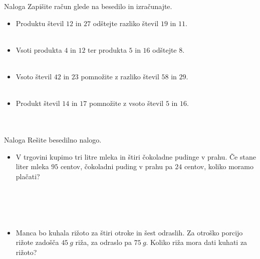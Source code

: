         \begin{frame}
            \begin{exampleblock}{Naloga}
                Zapišite račun glede na besedilo in izračunajte.
                \begin{itemize}
                    \item Produktu števil $12$ in $27$ odštejte razliko števil $19$ in $11$. \\ ~
                    \item Vsoti produkta $4$ in $12$ ter produkta $5$ in $16$ odštejte $8$. \\ ~
                    \item Vsoto števil $42$ in $23$ pomnožite z razliko števil $58$ in $29$. \\ ~
                    \item Produkt števil $14$ in $17$ pomnožite z vsoto števil $5$ in $16$. \\ ~ \\ ~
                \end{itemize}
            \end{exampleblock}
        \end{frame}

        \begin{frame}
            \begin{exampleblock}{Naloga}
                Rešite besedilno nalogo.
                \begin{itemize}
                    \item V trgovini kupimo tri litre mleka in štiri čokoladne pudinge v prahu. Če stane liter mleka $95$ centov,
                        čokoladni puding v prahu pa $24$ centov, koliko moramo plačati? \\ ~ \\ ~ \\ ~ \\ ~
                    \item Manca bo kuhala rižoto za štiri otroke in šest odraslih. Za otroško porcijo rižote zadošča $45~g$ riža,
                        za odraslo pa $75~g$. Koliko riža mora dati kuhati za rižoto? \\ ~ \\ ~ \\ ~ \\ ~
                \end{itemize}
            \end{exampleblock}
        \end{frame}


